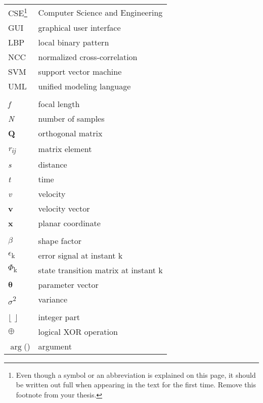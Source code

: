 \header{\headerabbreviations}
\setlongtables
\begin{longtable}[l]{p{3cm}p{}}

    CSE\footnote{Even though a symbol or an abbreviation is explained on this page, it should be written out full when appearing in the text for the first time. Remove this footnote from your thesis.} & Computer Science and Engineering\\
    GUI & graphical user interface\\
    LBP & local binary pattern\\
    NCC & normalized cross-correlation\\
    SVM & support vector machine\\
    UML & unified modeling language \\
    \\
    \textit{f} & focal length\\
    \textit{N} & number of samples\\
    \textbf{Q} & orthogonal matrix \\
    \textit{r\textsubscript{ij}} & matrix element \\
    \textit{s} & distance \\
    \textit{t} & time \\
    \textit{v} & velocity \\
    \textbf{v} & velocity vector \\
    \textbf{x} & planar coordinate \\
    \\
    $\beta$ & shape factor \\
    $\epsilon$\textsubscript{k} & error signal at instant k \\
    $\Phi$\textsubscript{k} & state transition matrix at instant k \\
    $\boldsymbol{\theta}$ & parameter vector \\
    $\sigma$\textsuperscript{2} & variance \\
    \\
    $\lfloor$ $\rfloor$ & integer part \\
    $\oplus$ & logical XOR operation \\
    $\arg$() & argument \\

\end{longtable}
\setcounter{table}{0}

